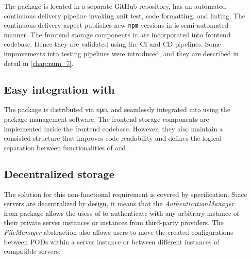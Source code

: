 The \lpas{} package is located in a separate GitHub repository, has an automated continuous delivery pipeline invoking unit test, code formatting, and linting. The continuous delivery aspect publishes new \texttt{npm} versions in is semi-automated manner. The frontend storage components in \lpa{} are incorporated into frontend codebase. Hence they are validated using the \lpa{} CI and CD pipelines. Some improvements into \lpa{} testing pipelines were introduced, and they are described in detail in \autoref{chap:num_7}.

\subsection{Easy integration with \lpa{}}

The \lpas{} package is distributed via \texttt{npm}, and seamlessly integrated into \lpa{} using the package management software. The frontend storage components are implemented inside the frontend codebase. However, they also maintain a consisted structure that improves code readability and defines the logical separation between functionalities of \lpa{} and \lpas{}.

\subsection{Decentralized storage}

The solution for this non-functional requirement is covered by \solid{} specification. Since \solid{} servers are decentralized by design, it means that the \textit{AuthenticationManager} from \lpas{} package allows the users of \lpa{} to authenticate with any arbitrary instance of their private \solid{} server instances or instances from third-party \solid{} providers. The \textit{FileManager} abstraction also allows users to move the created \lpa{} configurations between \solid{} PODs within a \solid{} server instance or between different instances of compatible \solid{} servers.
